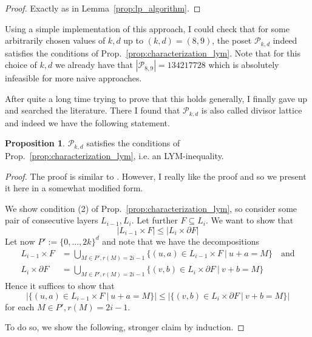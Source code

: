 \documentclass{scrartcl}
\theoremstyle{definition}
\newtheorem{proposition}[definition]{Proposition}
\begin{document}
\begin{proof}
    Exactly as in Lemma~\ref{prop:lp_algorithm}.
\end{proof}
Using a simple implementation of this approach, I could check that for some arbitrarily chosen values of $k, d$ up to $(k, d) = (8, 9)$, the poset $\mathcal{P}_{k, d}$ indeed satisfies the conditions of Prop.~\ref{prop:characterization_lym}.
Note that for this choice of $k, d$ we already have that $|\mathcal{P}_{8, 9}| = 134217728$ which is absolutely infeasible for more naive approaches.

After quite a long time trying to prove that this holds generally, I finally gave up and searched the literature.
There I found that $\mathcal{P}_{k, d}$ is also called divisor lattice and indeed we have the following statement.
\begin{proposition}
    $\mathcal{P}_{k, d}$ satisfies the conditions of Prop.~\ref{prop:characterization_lym}, i.e. an LYM-inequality.
\end{proposition}
\begin{proof}
    The proof is similar to \cite[Theorem 4.2.3]{anderson}.
    However, I really like the proof and so we present it here in a somewhat modified form.

    We show condition (2) of Prop.~\ref{prop:characterization_lym}, so consider some pair of consecutive layers $L_{i - 1}, L_i$.
    Let further $F \subseteq L_i$. 
    We want to show that
    \begin{equation*}
        |L_{i - 1} \times F| \leq |L_i \times \partial F|
    \end{equation*}
    Let now $P' := \{ 0, ..., 2k \}^d$ and note that we have the decompositions
    \begin{align*}
        L_{i - 1} \times F &= \bigcup_{M \in P', r(M) = 2i - 1} \{ (u, a) \in L_{i - 1} \times F \ | \ u + a = M \} \quad \text{and} \\
        L_i \times \partial F &= \bigcup_{M \in P', r(M) = 2i - 1} \{ (v, b) \in L_i \times \partial F \ | \ v + b = M \}
    \end{align*}
    Hence it suffices to show that
    \begin{equation*}
        |\{ (u, a) \in L_{i - 1} \times F \ | \ u + a = M \}| \leq |\{ (v, b) \in L_i \times \partial F \ | \ v + b = M \}|
    \end{equation*}
    for each $M \in P', r(M) = 2i - 1$.

    To do so, we show the following, stronger claim by induction.
\end{proof}
\end{document}
